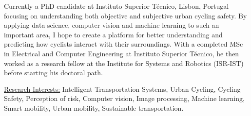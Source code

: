 \vspace{-9pt}

\begin{addmargin}[0pt]{.6cm}
    Currently a PhD candidate at Instituto Superior Técnico, Lisbon, Portugal focusing on understanding both objective and subjective urban cycling safety. By applying data science, computer vision and machine learning to such an important area, I hope to create a platform for better understanding and predicting how cyclists interact with their surroundings. With a completed MSc in Electrical and Computer Engineering at Instituto Superior Técnico, he then worked as a research fellow at the Institute for Systems and Robotics (ISR-IST) before starting his doctoral path.
\end{addmargin}


\vspace{3pt}
\begin{addmargin}[10pt]{1.cm}
    \underline{Research Interests:} Intelligent Transportation Systems, Urban Cycling, Cycling Safety, Perception of risk, Computer vision, Image processing, Machine learning, Smart mobility, Urban mobility, Sustainable transportation.
\end{addmargin}
\vspace{10pt}
